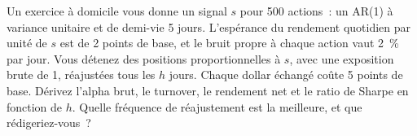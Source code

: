 \begin{question}\label{iq:iv2:research-and-strategy-cases:40}
Un exercice à domicile vous donne un signal $s$ pour 500 actions~: un AR(1) à variance unitaire et de demi-vie 5 jours. L'espérance du rendement quotidien par unité de $s$ est de 2 points de base, et le bruit propre à chaque action vaut 2~\% par jour. Vous détenez des positions proportionnelles à $s$, avec une exposition brute de 1, réajustées tous les $h$ jours. Chaque dollar échangé coûte 5 points de base. Dérivez l'alpha brut, le turnover, le rendement net et le ratio de Sharpe en fonction de $h$. Quelle fréquence de réajustement est la meilleure, et que rédigeriez-vous~?
\end{question}
